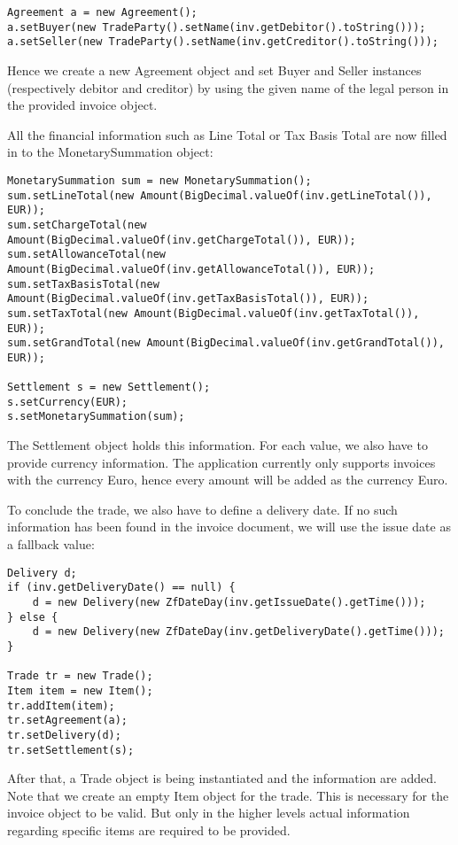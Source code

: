 \begin{lstlisting}
Agreement a = new Agreement();
a.setBuyer(new TradeParty().setName(inv.getDebitor().toString()));
a.setSeller(new TradeParty().setName(inv.getCreditor().toString()));
\end{lstlisting}

Hence we create a new Agreement object and set Buyer and Seller instances (respectively debitor and creditor) by using the given name of the legal person in the provided invoice object.

All the financial information such as Line Total or Tax Basis Total are now filled in to the MonetarySummation object:

\begin{lstlisting}
MonetarySummation sum = new MonetarySummation();
sum.setLineTotal(new Amount(BigDecimal.valueOf(inv.getLineTotal()), EUR));
sum.setChargeTotal(new Amount(BigDecimal.valueOf(inv.getChargeTotal()), EUR));
sum.setAllowanceTotal(new Amount(BigDecimal.valueOf(inv.getAllowanceTotal()), EUR));
sum.setTaxBasisTotal(new Amount(BigDecimal.valueOf(inv.getTaxBasisTotal()), EUR));
sum.setTaxTotal(new Amount(BigDecimal.valueOf(inv.getTaxTotal()), EUR));
sum.setGrandTotal(new Amount(BigDecimal.valueOf(inv.getGrandTotal()), EUR));

Settlement s = new Settlement();
s.setCurrency(EUR);
s.setMonetarySummation(sum);
\end{lstlisting}

The Settlement object holds this information. For each value, we also have to provide currency information. The application currently only supports invoices with the currency Euro, hence every amount will be added as the currency Euro.

To conclude the trade, we also have to define a delivery date. If no such information has been found in the invoice document, we will use the issue date as a fallback value:

\begin{lstlisting}
Delivery d;
if (inv.getDeliveryDate() == null) {
    d = new Delivery(new ZfDateDay(inv.getIssueDate().getTime()));
} else {
    d = new Delivery(new ZfDateDay(inv.getDeliveryDate().getTime()));
}

Trade tr = new Trade();
Item item = new Item();
tr.addItem(item);
tr.setAgreement(a);
tr.setDelivery(d);
tr.setSettlement(s);
\end{lstlisting}

After that, a Trade object is being instantiated and the information are added. Note that we create an empty Item object for the trade. This is necessary for the invoice object to be valid. But only in the higher levels actual information regarding specific items are required to be provided.

